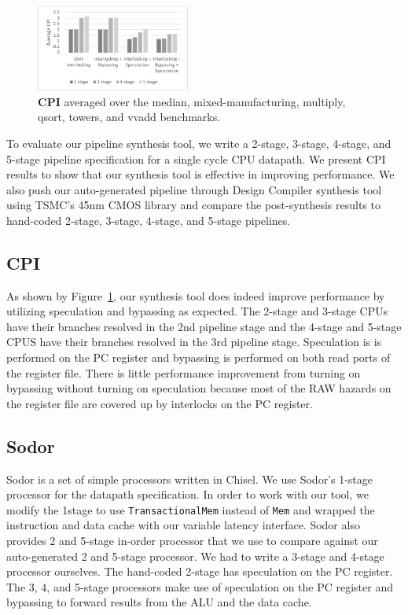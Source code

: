 \begin{figure}[htb]
\centering
\includegraphics[width=0.45\textwidth]{figures/cpi.pdf}
\caption{{\bf CPI} averaged over the median, mixed-manufacturing, multiply, qsort, towers, and vvadd benchmarks.}
\label{fig:CPI}
\end{figure}

To evaluate our pipeline synthesis tool, we write a 2-stage, 3-stage,
4-stage, and 5-stage pipeline specification for a single cycle CPU
datapath. We present CPI results to show that our synthesis tool is
effective in improving performance. We also push our auto-generated
pipeline through Design Compiler synthesis tool using TSMC's 45nm CMOS
library and compare the post-synthesis results to hand-coded 2-stage,
3-stage, 4-stage, and 5-stage pipelines.
\subsection{CPI}
As shown by Figure~\ref{fig:CPI}, our synthesis tool does indeed improve performance by utilizing speculation and bypassing as expected. The 2-stage and 3-stage CPUs have their branches resolved in the 2nd pipeline stage and the 4-stage and 5-stage CPUS have their branches resolved in the 3rd pipeline stage. Speculation is is performed on the PC register and bypassing is performed on both read ports of the register file. There is little performance improvement from turning on bypassing without turning on speculation because most of the RAW hazards on the register file are covered up by interlocks on the PC register.
\subsection{Sodor}
Sodor is a set of simple processors written in Chisel. We use Sodor's
1-stage processor for the datapath specification. In order to work
with our tool, we modify the 1stage to use {\tt TransactionalMem}
instead of {\tt Mem} and wrapped the instruction and data cache with
our variable latency interface. Sodor also provides 2 and 5-stage
in-order processor that we use to compare against our auto-generated 2
and 5-stage processor. We had to write a 3-stage and 4-stage processor
ourselves. The hand-coded 2-stage has speculation on the PC
register. The 3, 4, and 5-stage processors make use of speculation on
the PC register and bypassing to forward results from the ALU and the
data cache.


